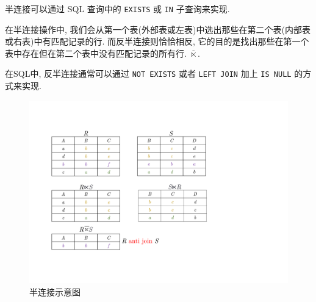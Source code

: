 半连接可以通过 SQL 查询中的 \verb|EXISTS| 或 \verb|IN| 子查询来实现.

\begin{definition}[反半连接]
在半连接操作中, 我们会从第一个表(外部表或左表)中选出那些在第二个表(内部表或右表)中有匹配记录的行. 
而反半连接则恰恰相反, 它的目的是找出那些在第一个表中存在但在第二个表中没有匹配记录的所有行. $\overline{\ltimes}$.
\end{definition}

在SQL中, 反半连接通常可以通过 \verb|NOT EXISTS| 或者 \verb|LEFT JOIN| 加上 \verb|IS NULL| 的方式来实现.

\begin{figure}[H]
    \centering
    \includegraphics[width=.6\textwidth]{./figure/半连接.pdf}
    \caption{半连接示意图}
\end{figure}
